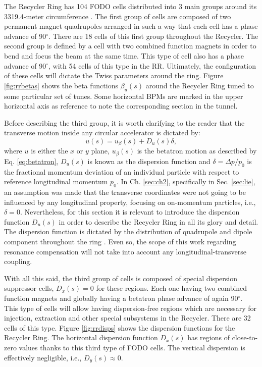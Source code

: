 The Recycler Ring has 104 FODO cells distributed into 3 main groups around its 3319.4-meter circumference \cite{rr0}. The first group of cells are composed of two permanent magnet quadrupoles arranged in such a way that each cell has a phase advance of 90$^{\circ}$. There are 18 cells of this first group throughout the Recycler. The second group is defined by a cell with two combined function magnets in order to bend and focus the beam at the same time. This type of cell also has a phase advance of 90$^{\circ}$, with 54 cells of this type in the RR. Ultimately, the configuration of these cells will dictate the Twiss parameters around the ring. Figure \ref{fig:rrbetas} shows the beta functions $\beta_u(s)$ around the Recycler Ring tuned to some particular set of tunes. Some horizontal BPMs are marked in the upper horizontal axis as reference to note the corresponding section in the tunnel.    

Before describing the third group, it is worth clarifying to the reader that the transverse motion inside any circular accelerator is dictated by:
\begin{equation}
   \label{eq:utotal}
   u(s) = u_{\beta}(s) + D_u(s) \delta,
\end{equation}
where $u$ is either the $x$ or $y$ plane, $u_{\beta}(s)$ is the betatron motion as described by Eq. \ref{eq:betatron}, $D_u(s)$ is known as the dispersion function and $\delta=\Delta p/p_0$ is the fractional momentum deviation of an individual particle with respect to reference longitudinal momentum $p_0$. In Ch. \ref{sec:ch2}, specifically in Sec. \ref{sec:lie}, an assumption was made that the transverse coordinates were not going to be influenced by any longitudinal property, focusing on on-momentum particles, i.e., $\delta =0$. Nevertheless, for this section it is relevant to introduce the dispersion function $D_u(s)$ in order to describe the Recycler Ring in all its glory and detail. The dispersion function is dictated by the distribution of quadrupole and dipole component throughout the ring \cite{sylee}. Even so, the scope of this work regarding resonance compensation will not take into account any longitudinal-transverse coupling.   

With all this said, the third group of cells is composed of special dispersion suppressor cells, $D_x(s)=0$ for these regions. Each one having two combined function magnets and globally having a betatron phase advance of again 90$^{\circ}$. This type of cells will allow having dispersion-free regions which are necessary for injection, extraction and other special subsystems in the Recycler. There are 32 cells of this type. Figure \ref{fig:rrdisps} shows the dispersion functions for the Recycler Ring. The horizontal dispersion function $D_x(s)$ has regions of close-to-zero values thanks to this third type of FODO cells. The vertical dispersion is effectively negligible, i.e., $D_y(s)\approx 0$.

